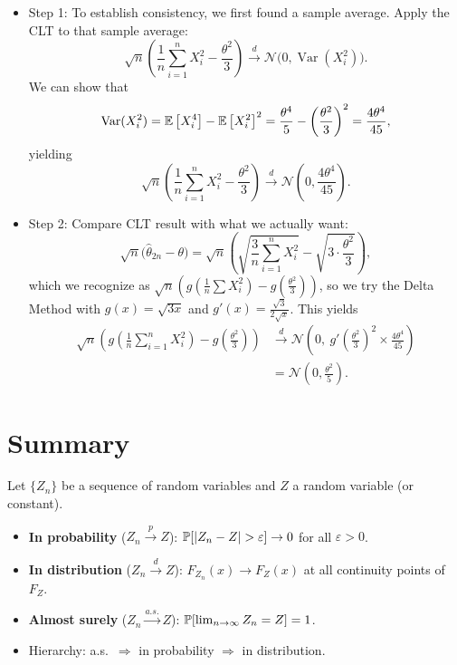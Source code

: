 \begin{example}
	\begin{itemize}
		\item Step 1: To establish consistency, we first found a sample average. Apply the CLT to that sample average:
		      \[
			      \sqrt{n}\left(\frac{1}{n}\sum_{i=1}^n X_i^2-\frac{\theta^2}{3}\right)\xrightarrow{d}\mathcal{N}\big(0,\operatorname{Var}(X_i^2)\big).
		      \]
		      We can show that
		      \[
			      \operatorname{Var}(X_i^2)=\E\left[X_i^4\right]-\E\left[X_i^2\right]^2=\frac{\theta^4}{5}-\left(\frac{\theta^2}{3}\right)^2=\frac{4\theta^4}{45},
		      \]
		      yielding
		      \[
			      \sqrt{n}\left(\frac{1}{n}\sum_{i=1}^n X_i^2-\frac{\theta^2}{3}\right)\xrightarrow{d}\mathcal{N}\left(0,\frac{4\theta^4}{45}\right).
		      \]
		\item Step 2: Compare CLT result with what we actually want:
		      \[
			      \sqrt{n}\big(\hat\theta_{2n}-\theta\big)
			      =
			      \sqrt{n}\left(\sqrt{\frac{3}{n}\sum_{i=1}^n X_i^2}-\sqrt{3\cdot \frac{\theta^2}{3}}\right),
		      \]
			  which we recognize as $\sqrt{n} \left(g\left( \frac{1}{n}\sum X_i^2 \right) - g\left( \frac{\theta^2}{3} \right) \right)$,
		      so we try the Delta Method with $g(x)=\sqrt{3x}$ and $g'(x)=\frac{\sqrt{3}}{2\sqrt{x}}$. This yields
		      \begin{align*}
			      \sqrt{n}\!\left(g\!\left(\tfrac{1}{n}\sum_{i=1}^n X_i^2\right)-g\!\left(\tfrac{\theta^2}{3}\right)\right)
			      &\xrightarrow{d}
			      \mathcal{N}\!\left(0,\ g'\!\left(\tfrac{\theta^2}{3}\right)^{\!2}\times \tfrac{4\theta^4}{45}\right) \\
			      &= \mathcal{N}\!\left(0,\tfrac{\theta^2}{5}\right).
		      \end{align*}
	\end{itemize}
\end{example}


\section{Summary}

\begin{remark}
	Let $\{Z_n\}$ be a sequence of random variables and $Z$ a random variable (or constant).
	\begin{itemize}
		\item \textbf{In probability} ($Z_n\xrightarrow{p}Z$): $\P[|Z_n-Z|>\varepsilon]\to 0$ for all $\varepsilon>0$.
		\item \textbf{In distribution} ($Z_n\xrightarrow{d}Z$): $F_{Z_n}(x)\to F_Z(x)$ at all continuity points of $F_Z$.
		\item \textbf{Almost surely} ($Z_n\xrightarrow{a.s.}Z$): $\P[\lim_{n\to\infty}Z_n=Z]=1$.
		\item Hierarchy: a.s.\ $\Rightarrow$ in probability $\Rightarrow$ in distribution.
	\end{itemize}
\end{remark}

